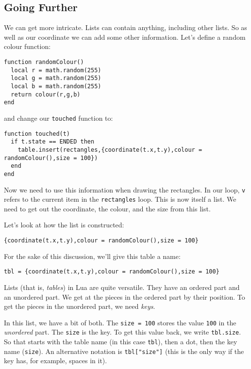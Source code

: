 \documentclass[
  xhtml,%
  use filename%
]{internet}
\begin{document}
\subsection{Going Further}

We can get more intricate.
Lists can contain anything, including other lists.
So as well as our coordinate we can add some other information.
Let's define a random colour function:

\begin{verbatim}
function randomColour()
  local r = math.random(255)
  local g = math.random(255)
  local b = math.random(255)
  return colour(r,g,b)
end
\end{verbatim}

\noindent and change our \verb+touched+ function to:

\begin{verbatim}
function touched(t)
  if t.state == ENDED then
    table.insert(rectangles,{coordinate(t.x,t.y),colour = randomColour(),size = 100})
  end
end
\end{verbatim}

Now we need to use this information when drawing the rectangles.
In our loop, \verb+v+ refers to the current item in the \verb+rectangles+ loop.
This is now itself a list.
We need to get out the coordinate, the colour, and the size from this list.

Let's look at how the list is constructed:

\begin{verbatim}
{coordinate(t.x,t.y),colour = randomColour(),size = 100}
\end{verbatim}

For the sake of this discussion, we'll give this table a name:

\begin{verbatim}
tbl = {coordinate(t.x,t.y),colour = randomColour(),size = 100}
\end{verbatim}


Lists (that is, \emph{tables}) in Lua are quite versatile.
They have an ordered part and an unordered part.
We get at the pieces in the ordered part by their position.
To get the pieces in the unordered part, we need \emph{keys}.

In this list, we have a bit of both.
The \verb+size = 100+ stores the value \verb+100+ in the \emph{unordered} part.
The \verb+size+ is the key.
To get this value back, we write \verb+tbl.size+.
So that starts with the table name (in this case \verb+tbl+), then a dot, then the key name (\verb+size+).
An alternative notation is \verb+tbl["size"]+ (this is the only way if the key has, for example, spaces in it).
\end{document}
